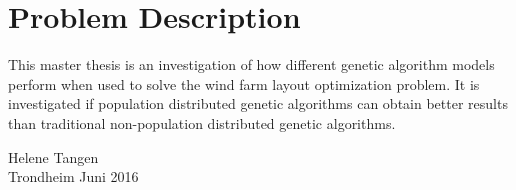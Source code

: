 \section*{Problem Description}
This master thesis is an investigation of how different genetic algorithm models perform when used to solve the wind farm layout optimization problem. It is investigated if population distributed genetic algorithms can obtain better results than traditional non-population distributed genetic algorithms. 

\vfill

\begin{flushright}
Helene Tangen\\
Trondheim Juni 2016
\end{flushright}